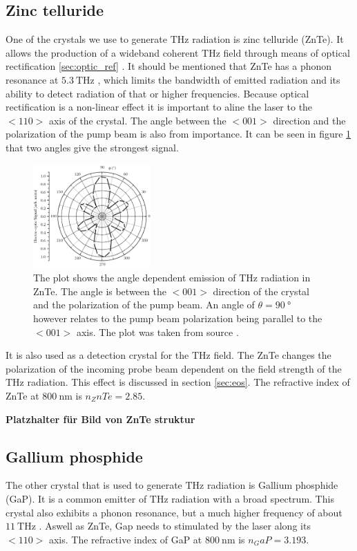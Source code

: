 \subsection{Zinc telluride}
\label{sec:znte}
One of the crystals we use to generate $\si{\tera\hertz}$ radiation is zinc telluride (ZnTe). 
It allows the production of a wideband coherent $\si{\tera\hertz}$ field through means of optical rectification \ref{sec:optic_ref} \cite{ZnTe_Nahata_Weling_1996}.
It should be mentioned that ZnTe has a phonon resonance at $\SI{5.3}{\tera\hertz}$ \cite{phonon_modes}, which limits the bandwidth of emitted radiation and its ability to detect radiation of that or higher frequencies.
Because optical rectification is a non-linear effect it is important to aline the laser to the $<110>$ axis of the crystal.
The angle between the $<001>$ direction and the polarization of the pump beam is also from importance.
It can be seen in figure \ref{fig:polarization_dependence_angle} that two angles give the strongest signal.
\begin{figure}
    \centering
    \includegraphics[width=0.4\textwidth]{refferenced_pic/degreedepenceZnTe.png}
    \caption{The plot shows the angle dependent emission of $\si{\tera\hertz}$ radiation in ZnTe.
    The angle is between the $<001>$ direction of the crystal and the polarization of the pump beam. An angle of $\theta = \SI{90}{\degree}$ however relates to the pump beam polarization being parallel to the $<001>$ axis.
    The plot was taken from source \cite{selig}.}
    \label{fig:polarization_dependence_angle}
\end{figure}
It is also used as a detection crystal for the $\si{\tera\hertz}$ field.
The ZnTe changes the polarization of the incoming probe beam dependent on the field strength of the $\si{\tera\hertz}$ radiation.
This effect is discussed in section \ref{sec:eos}.
The refractive index of ZnTe at $\SI{800}{\nano\meter}$ is $n_ZnTe = 2.85$.

\textbf{Platzhalter für Bild von ZnTe struktur}

\subsection{Gallium phosphide}
The other crystal that is used to generate $\si{\tera\hertz}$ radiation is Gallium phosphide (GaP).
It is a common emitter of $\si{\tera\hertz}$ radiation with a broad spectrum.
This crystal also exhibits a phonon resonance, but a much higher frequency of about $\SI{11}{\tera\hertz}$ \cite[60]{wiki_book}.
Aswell as ZnTe, Gap needs to stimulated by the laser along its $<110>$ axis.
The refractive index of GaP at $\SI{800}{\nano\meter}$ is $n_GaP = 3.193$.

